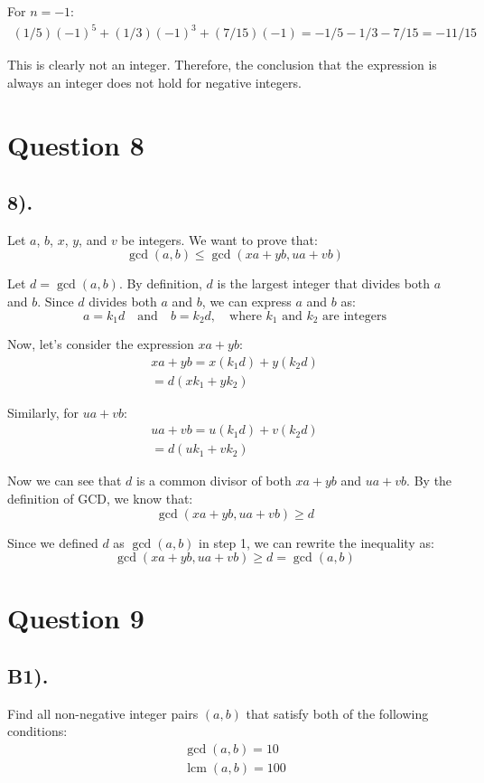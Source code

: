 \documentclass[12pt]{article}
\begin{document}
For $n = -1$:
\begin{gather*}
    (1/5){(-1)}^5 + (1/3){(-1)}^3 + (7/15)(-1) = -1/5 - 1/3 - 7/15 = -11/15
\end{gather*}

This is clearly not an integer. Therefore, the conclusion that the expression is always an integer does not hold for negative integers.

\section*{Question 8}
\subsection*{8).}
Let $a$, $b$, $x$, $y$, and $v$ be integers. We want to prove that:
\[
    \gcd(a,b) \leq \gcd(xa+yb, ua+vb)
\]

Let $d = \gcd(a,b)$. By definition, $d$ is the largest integer that divides both $a$ and $b$.
Since $d$ divides both $a$ and $b$, we can express $a$ and $b$ as:
\[
    a = k_1d \quad \text{and} \quad b = k_2d, \quad \text{where } k_1 \text{ and } k_2 \text{ are integers}
\]

Now, let's consider the expression $xa + yb$:
\begin{gather*}
    xa + yb = x(k_1d) + y(k_2d) \\
            = d(xk_1 + yk_2)
\end{gather*}

Similarly, for $ua + vb$:
\begin{gather*}
    ua + vb = u(k_1d) + v(k_2d) \\
            = d(uk_1 + vk_2)
\end{gather*}

Now we can see that $d$ is a common divisor of both $xa + yb$ and $ua + vb$.
By the definition of GCD, we know that:
\[
    \gcd(xa+yb, ua+vb) \geq d
\]

Since we defined $d$ as $\gcd(a,b)$ in step 1, we can rewrite the inequality as:
\[
    \gcd(xa+yb, ua+vb) \geq d = \gcd(a,b)
\]

\section*{Question 9}
\subsection*{B1).}

Find all non-negative integer pairs $(a, b)$ that satisfy both of the following conditions:
\begin{gather*}
    \gcd(a, b) = 10 \\
    \operatorname{lcm}(a, b) = 100
\end{gather*}
\end{document}
